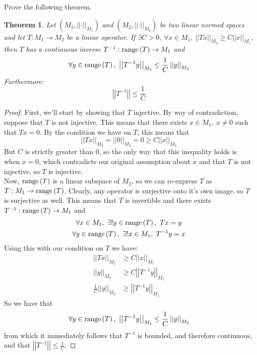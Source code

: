 \documentclass{article}
\newcommand{\norm}[1]{\left|\left|#1\right|\right|}
\newcommand{\parens}[1]{\left(#1\right)}
\newcommand{\range}[1]{\textup{range}\parens{#1}}
\newtheorem*{theorem}{Theorem}
\begin{document}
    \item Prove the following theorem.
    \begin{theorem}
    Let $\parens{M_1, \norm{\cdot}_{M_1}}$ and $\parens{M_2, \norm{\cdot}_{M_2}}$
    be two linear normed spaces and let $T: M_1 \to M_2$ be a linear operator.
    If $\exists C > 0,\ \forall x \in M_1,\ \norm{Tx}_{M_2} \geq C\norm{x}_{M_1}$,
    then $T$ has a continuous inverse $T^{-1}: \range{T} \to M_1$ and 
    $$\forall y \in \range{T},\ \norm{T^{-1}y}_{M_1} \leq \frac{1}{C}\norm{y}_{M_2}$$
    Furthermore:
    $$\norm{T^{-1}} \leq \frac{1}{C}$$
    \end{theorem}
    \begin{proof}
    First, we'll start by showing that $T$ injective. By way of contradiction,
    suppose that $T$ is not injective. This means that there exists $x\in M_1,\ 
    x \neq 0$ such that $Tx = 0$. By the condition we have on $T$, this means 
    that
    $$\norm{Tx}_{M_2} = \norm{0}_{M_2} = 0 \geq C\norm{x}_{M_1}$$
    But $C$ is strictly greater than $0$, so the only way that this inequality
    holds is when $x=0$, which contradicts our original assumption about $x$ 
    and that $T$ is not injective, so $T$ is injective. \\Now, $\range{T}$ is
    a linear subspace of $M_2$, so we can re-express $T$ as $T: M_1 \to 
    \range{T}$. Clearly, any operator is surjective onto it's own image,
    so $T$ is surjective as well. This means that $T$ is invertible and 
    there exists $T^{-1}: \range{T} \to M_1$ and 
    \begin{gather*}
    \forall x \in M_1,\ \exists!y\in \range{T},\ Tx=y \\
    \forall y \in \range{T},\ \exists! x\in M_1,\ T^{-1}y = x
    \end{gather*}
    Using this with our condition on $T$ we have:
    \begin{align*}
    \norm{Tx}_{M_2} &\geq C\norm{x}_{M_1} \\
    \norm{y}_{M_2} & \geq C\norm{T^{-1}y}_{M_1} \\
    \frac{1}{C}\norm{y}_{M_2} & \geq \norm{T^{-1}y}_{M_1}
    \end{align*}
    So we have that 
    $$\forall y \in \range{T},\ \norm{T^{-1}y}_{M_1} \leq \frac{1}{C}\norm{y}_{M_2}$$
    from which it immediately follows that $T^{-1}$ is bounded, and therefore continuous,
    and that $\norm{T^{-1}}\leq \frac{1}{C}$.
\end{proof}
\end{document}
